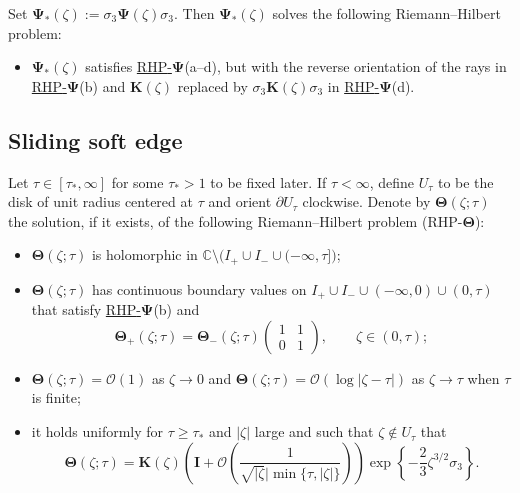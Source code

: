 \documentclass[10pt,a4paper]{amsart}
\numberwithin{equation}{section}
\newcommand{\C}		{\mathbb{C}}
\newcommand{\rhpsi} {\textnormal{RHP}-${\boldsymbol \Psi}$}
\newcommand{\rhth} {\textnormal{RHP}-${\boldsymbol \Theta}$}
\begin{document}
 Set $ \boldsymbol \Psi_*(\zeta) := \sigma_3\boldsymbol\Psi(\zeta)\sigma_3 $. Then $ \boldsymbol \Psi_*(\zeta) $ solves the following Riemann--Hilbert problem:
 \begin{itemize}\itemsep=0pt\setlength{\leftskip}{0.1cm}
\label{rhwpsi}
\item[(a--d)] $\boldsymbol\Psi_*(\zeta)$ satisfies \hyperref[rhpsi]{\rhpsi}(a--d), but with the reverse orientation of the rays in \hyperref[rhpsi]{\rhpsi}(b) and $ \boldsymbol K(\zeta) $ replaced by $ \sigma_3\boldsymbol K(\zeta)\sigma_3 $ in \hyperref[rhpsi]{\rhpsi}(d).
\end{itemize}


\subsection{Sliding soft edge}
\label{ss:sse}


Let $ \tau\in[\tau_*,\infty] $ for some $ \tau_*>1 $ to be fixed later. If $ \tau<\infty $, define $ U_\tau $ to be the disk of unit radius centered at $ \tau $ and orient $ \partial U_\tau $ clockwise. Denote by $\boldsymbol\Theta(\zeta;\tau)$ the solution, if it exists, of the following Riemann--Hilbert problem (\rhth):
\begin{itemize}\itemsep=0pt
\label{rhth}
\item[(a)] $\boldsymbol\Theta(\zeta;\tau)$ is holomorphic in $\C\setminus\bigl(I_+\cup I_-\cup(-\infty,\tau]\bigr)$;
\item[(b)] $\boldsymbol\Theta(\zeta;\tau)$ has continuous boundary values on $I_+\cup I_-\cup(-\infty,0)\cup(0,\tau)$ that satisfy \hyperref[rhpsi]{\rhpsi}(b) and
\[
\boldsymbol\Theta_+(\zeta;\tau) = \boldsymbol\Theta_-(\zeta;\tau) \left(\begin{matrix} 1 & 1 \\ 0 & 1 \end{matrix}\right), \qquad \zeta\in(0,\tau);
\]
\item[(c)] $ \boldsymbol\Theta(\zeta;\tau)=\boldsymbol{\mathcal O}(1) $ as $\zeta\to0$ and $ \boldsymbol\Theta(\zeta;\tau)=\boldsymbol{\mathcal O}(\log|\zeta-\tau|) $ as $\zeta\to\tau$ when $ \tau $ is finite;
\item[(d)] it holds uniformly for $ \tau\geq\tau_* $ and $ |\zeta| $ large and such that $ \zeta\not\in U_\tau $ that
\[
\boldsymbol\Theta(\zeta;\tau) = \boldsymbol K(\zeta)\left(\boldsymbol I+\boldsymbol{\mathcal O}\left(\frac1{\sqrt{|\zeta}|\min\{\tau,|\zeta|\}}\right)\right) \exp\left\{-\frac23\zeta^{3/2}\sigma_3\right\}.
\]
\end{itemize}
\end{document}
